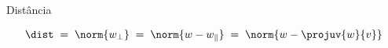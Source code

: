 \begin{resolution}{Distância}

    \[
      \dist
      \;=\; \norm{w_\perp}
      \;=\; \norm{w - w_{\parallel}}
      \;=\; \norm{w - \projuv{w}{v}}
    \]
\end{resolution}

\endinput



\pause

A projeção é

\[
\operatorname{proj}_{\vec{v}}\vec{w}
=
(3,0)
\]

Logo

\[
\vec{w}_{\perp}
=
(3,4)-(3,0)
\]

\[
\vec{w}_{\perp}
=
(0,4)
\]

Portanto

\[
\operatorname{dist}
=
\|\vec{w}_{\perp}\|
\]

\[
\operatorname{dist}=4
\]

\end{frame}